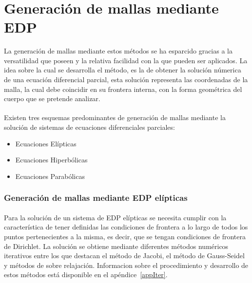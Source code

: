 \documentclass[letterpaper, openright, 12pt]{book}
\begin{document}
\section{Generación de mallas mediante EDP}
    \paragraph*{}
    La generación de mallas mediante estos métodos se ha esparcido gracias a
    la versatilidad que poseen y la relativa facilidad con la que pueden ser
    aplicados. La idea sobre la cual se desarrolla el método, es la de
    obtener la solución númerica de una ecuación diferencial parcial, esta
    solución representa las coordenadas de la malla, la cual debe coincidir
    en su frontera interna, con la forma geométrica del cuerpo que se
    pretende analizar.\cite{siladicParabolic}

    \paragraph*{}
    Existen tres esquemas predominantes de generación de mallas mediante la
    solución de sistemas de ecuaciones diferenciales parciales:
    \begin{itemize}
        \item Ecuaciones Elípticas
        \item Ecuaciones Hiperbólicas
        \item Ecuaciones Parabólicas
    \end{itemize}

    \subsubsection{Generación de mallas mediante EDP elípticas}
    \paragraph*{}
    Para la solución de un sistema de EDP elípticas se necesita cumplir con la
    característica de tener definidas las condiciones de frontera a lo largo de
    todos los puntos pertenecientes a la misma, es decir, que se tengan
    condiciones de frontera de Dirichlet.
    La solución se obtiene mediante diferentes métodos numéricos iterativos
    entre los que destacan el método de Jacobi, el método de Gauss-Seidel y
    métodos de sobre relajación. Informacion sobre el procedimiento y
    desarrollo de estos métodos está disponible en el apéndice~\ref{appIter}.
\end{document}
